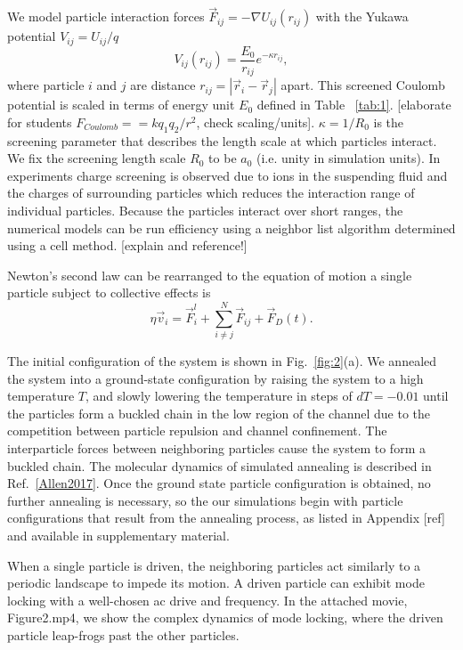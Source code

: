 \documentclass[twocolumn,preprintnumbers,amsmath,amssymb,aps,prx]{revtex4}
\begin{document}
 We model particle interaction forces
$\vec{F}_{ij} = -\nabla U_{ij}(r_{ij})$ 
with
the Yukawa potential $V_{ij} = U_{ij} / q$ 
\begin{equation}
  V_{ij}(r_{ij}) = \frac{E_0}{r_{ij}} e^{-\kappa r_{ij}},
  \label{eq:yukawa}
\end{equation}
where particle $i$ and $j$ are distance
$r_{ij} = |\vec{r}_i - \vec{r}_j|$ apart.
This 
screened Coulomb potential
is scaled in terms of energy unit $E_0$
defined in Table ~\ref{tab:1}.
[elaborate for students $F_{Coulomb} = = k q_1 q_2 / r^2$, check scaling/units].
$\kappa = 1/R_0$ is the screening parameter 
that describes the length scale at
which particles interact.
We fix the screening length scale $R_0$ to be $a_0$
(i.e. unity in simulation units).
In experiments charge screening is observed
due to ions in the suspending fluid and
the charges of surrounding particles
which
reduces the interaction range of individual particles. %
Because the particles interact over short ranges, 
the numerical models can be run efficiency
using a neighbor list algorithm
determined using a cell method.
[explain and reference!]

Newton's second law can be rearranged %
to
the equation of motion a single particle subject to collective effects is 
\begin{equation}
  \eta \vec{v}_i = \vec{F}^l_{i} + \sum_{i \neq j}^{N} \vec{F}_{ij} + \vec{F}_{D}(t).
    \label{eq:motion}
\end{equation}

The initial configuration of the system is shown in 
Fig.~\ref{fig:2}(a).  
We annealed the system into a ground-state configuration
by raising the system to a high temperature $T$,
and slowly lowering the temperature in steps of $dT=-0.01$
until the particles form a buckled chain in the low region of the channel
due to the
competition between particle repulsion and channel confinement.
The interparticle forces between neighboring particles
cause the system to form a buckled chain. %
The molecular dynamics of simulated annealing
is described in Ref.~\ref{Allen2017}.
Once the ground state particle configuration is obtained,
no further annealing is necessary,
so the
our simulations begin with particle configurations
that result from the annealing process,
as listed in Appendix [ref] and available in supplementary material.

When a single particle is driven, the neighboring particles act similarly to a periodic landscape to impede its motion. A driven particle can exhibit mode locking with a well-chosen ac drive and frequency. In the attached movie, Figure2.mp4, we show the complex dynamics of mode locking, where the driven particle leap-frogs past the other particles. 
\end{document}
